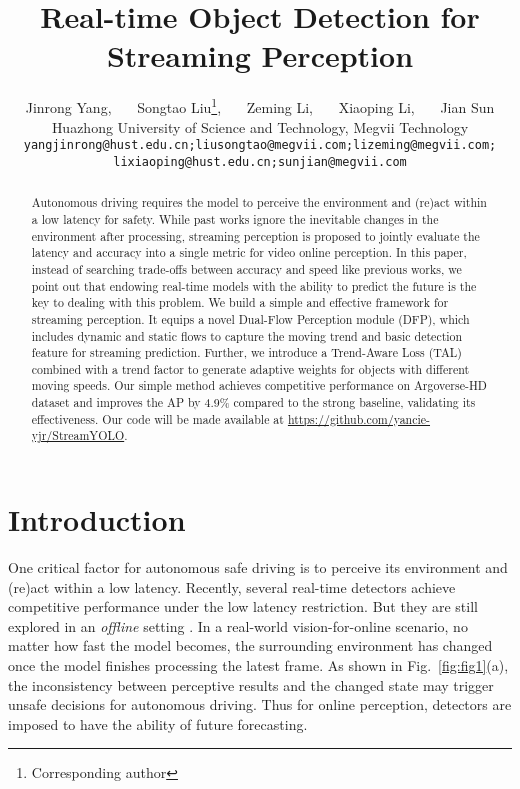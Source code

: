 \documentclass[10pt,twocolumn,letterpaper]{article}
\begin{document}
\title{Real-time Object Detection for Streaming Perception}

\author{Jinrong Yang,~~~ Songtao Liu\thanks{Corresponding author},~~~ Zeming Li,~~~ Xiaoping Li,~~~ Jian Sun\\
Huazhong University of Science and Technology, Megvii Technology\\
\tt\small yangjinrong@hust.edu.cn;liusongtao@megvii.com;lizeming@megvii.com;
\\
\tt\small lixiaoping@hust.edu.cn;sunjian@megvii.com}

\maketitle
\begin{abstract}
   Autonomous driving requires the model to perceive the environment and (re)act within a low latency for safety. While past works ignore the inevitable changes in the environment after processing, streaming perception is proposed to jointly evaluate the latency and accuracy into a single metric for video online perception. In this paper, instead of searching trade-offs between accuracy and speed like previous works, we point out that endowing real-time models with the ability to predict the future is the key to dealing with this problem. We build a simple and effective framework for streaming perception. It equips a novel Dual-Flow Perception module (DFP), which includes dynamic and static flows to capture the moving trend and basic detection feature for streaming prediction. Further, we introduce a Trend-Aware Loss (TAL) combined with a trend factor to generate adaptive weights for objects with different moving speeds. Our simple method achieves competitive performance on Argoverse-HD dataset and improves the AP by 4.9\% compared to the strong baseline, validating its effectiveness. Our code will be made available at \url{https://github.com/yancie-yjr/StreamYOLO}.
   
\end{abstract}

\section{Introduction}
\label{sec:intro}

One critical factor for autonomous safe driving is to perceive its environment and (re)act within a low latency. 
Recently, several real-time detectors \cite{yolo1,yolo2,yolo3,yolo4,yolo5,yolox,rfb,asff} achieve competitive performance under the low latency restriction. But they are still explored in an \emph{offline} setting \cite{streamer}. In a real-world vision-for-online scenario, no matter how fast the model becomes, the surrounding environment has changed once the model finishes processing the latest frame. As shown in Fig.~\ref{fig:fig1}(a), the inconsistency between perceptive results and the changed state may trigger unsafe decisions for autonomous driving. Thus for online perception, detectors are imposed to have the ability of future forecasting. 
\end{document}
